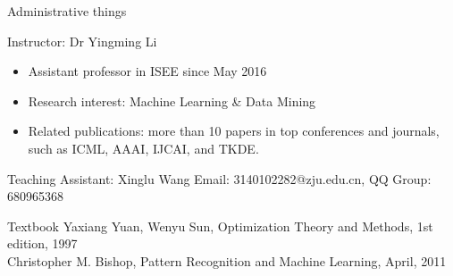 \documentclass[notes]{beamer}
\begin{document}
\begin{frame}{Administrative things} 
	\begin{block}{Instructor: Dr Yingming Li}
		\begin{itemize}
			\item Assistant professor in ISEE since May 2016
			\item Research interest: Machine Learning \& Data Mining
			\item Related publications: more than 10 papers in top conferences and journals, such as ICML, AAAI, IJCAI, and TKDE.
		\end{itemize}
	\end{block}
	\begin{block}{Teaching Assistant: Xinglu Wang}
			Email: 3140102282@zju.edu.cn, QQ Group: 680965368

	\end{block}
	\begin{block}{Textbook}
		Yaxiang Yuan, Wenyu Sun, Optimization Theory and Methods, 1st edition, 1997\\
		Christopher M. Bishop, Pattern Recognition and Machine Learning, April, 2011
	\end{block}
\end{frame}


\end{document}

